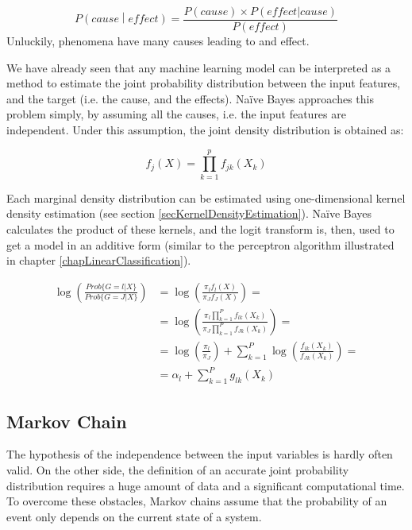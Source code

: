 \begin{equation}
        P\left(cause\middle| effect\right)=\frac{P\left(cause\right)\times P(effect|cause)}{P(effect)}
        \label{eq_naiveBayes1}
\end{equation}
Unluckily, phenomena have many causes leading to and effect. \par

We have already seen that any machine learning model can be interpreted as a method to estimate the joint probability distribution between the input features, and the target (i.e. the cause, and the effects). Naïve Bayes approaches this problem simply, by assuming all the causes, i.e. the input features are independent. Under this assumption, the joint density distribution is obtained as:

\begin{equation}
        f_j\left(X\right)=\prod_{k=1}^{p}{f_{jk}(X_k)}
        \label{eq_naiveBayes2}
\end{equation}

Each marginal density distribution can be estimated using one-dimensional kernel density estimation (see section \ref{secKernelDensityEstimation}). Naïve Bayes calculates the product of these kernels, and the logit transform is, then, used to get a model in an additive form (similar to the perceptron algorithm illustrated in chapter \ref{chapLinearClassification}).

\begin{equation}
\begin{split}
        \log\left(\frac{Prob\{G=l|X\}}{Prob\{G=J|X\}}\right) & =\log\left(\frac{\pi_lf_l(X)}{\pi_Jf_J(X)}\right)=\\
        & =\log{\left(\frac{\pi_l\prod_{k=1}^{P}{f_{lk}(X_k)}}{\pi_J\prod_{k=1}^{P}{f_{Jk}(X_k)}}\right)=}\\
        & =\log{\left(\frac{\pi_l}{\pi_J}\right)+\sum_{k=1}^{P}\log{\left(\frac{f_{lk}(X_k)}{f_{Jk}(X_k)}\right)=}}\\
        & =\alpha_l+\sum_{k=1}^{P}{g_{lk}(X_k)}
\end{split}
\label{eq_naiveBayes3}
\end{equation}

\subsection{Markov Chain} \label{secMarkovChain}
The hypothesis of the independence between the input variables is hardly often valid. On the other side, the definition of an accurate joint probability distribution requires a huge amount of data and a significant computational time. To overcome these obstacles, Markov chains assume that the probability of an event only depends on the current state of a system. \par

